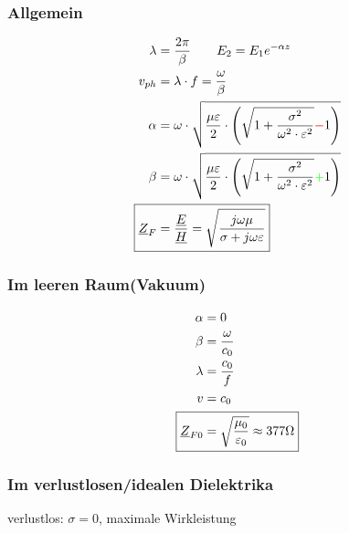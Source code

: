 \subsubsection{Allgemein}
\begin{align*}
    \lambda                 & = \dfrac{2\pi}{\beta} \qquad E_2 = E_1 e^{-\alpha z}                                                                                        \\
    v_{ph}                  & = \lambda\cdot f = \dfrac{\omega}{\beta}                                                                                                    \\
    \alpha                  & = \omega \cdot \sqrt{\dfrac{\mu \varepsilon}{2}\cdot \left(\sqrt{1+\dfrac{\sigma^2}{\omega^2\cdot\varepsilon^2}}{\color{red}{-}}1\right)}   \\
    \beta                   & = \omega \cdot \sqrt{\dfrac{\mu \varepsilon}{2}\cdot \left(\sqrt{1+\dfrac{\sigma^2}{\omega^2\cdot\varepsilon^2}}{\color{green}{+}}1\right)} \\
    \Aboxed{\underline{Z}_F & = \dfrac{\underline{E}}{\underline{H}} = \sqrt{\dfrac{j\omega\mu}{\sigma+j\omega\varepsilon}}}        \\
\end{align*}

\subsubsection{Im leeren Raum(Vakuum)}
\begin{align*}
    \alpha                     & = 0                                                    \\
    \beta                      & = \dfrac{\omega}{c_0}                                  \\
    \lambda                    & = \dfrac{c_0}{f}                                       \\
    v                          & = c_0                                                  \\
    \Aboxed{\underline{Z}_{F0} & = \sqrt{\dfrac{\mu_0}{\varepsilon_0}}\approx377\Omega}
\end{align*}

\subsubsection{Im verlustlosen/idealen Dielektrika}
verlustlos: $\sigma =0$, maximale Wirkleistung

